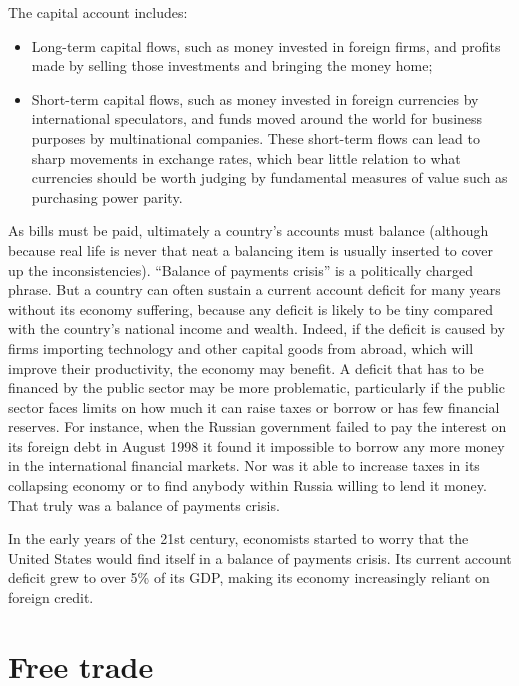 \documentclass[11pt,]{book}
\providecommand{\tightlist}{%
  \setlength{\itemsep}{0pt}\setlength{\parskip}{0pt}}
\theoremstyle{definition}
\theoremstyle{definition}
\theoremstyle{definition}
\theoremstyle{remark}
\begin{document}
The capital account includes:

\begin{itemize}
\tightlist
\item
  Long-term capital flows, such as money invested in foreign firms, and
  profits made by selling those investments and bringing the money home;
\item
  Short-term capital flows, such as money invested in foreign currencies
  by international speculators, and funds moved around the world for
  business purposes by multinational companies. These short-term flows
  can lead to sharp movements in exchange rates, which bear little
  relation to what currencies should be worth judging by fundamental
  measures of value such as purchasing power parity.
\end{itemize}

As bills must be paid, ultimately a country's accounts must balance
(although because real life is never that neat a balancing item is
usually inserted to cover up the inconsistencies). ``Balance of payments
crisis'' is a politically charged phrase. But a country can often
sustain a current account deficit for many years without its economy
suffering, because any deficit is likely to be tiny compared with the
country's national income and wealth. Indeed, if the deficit is caused
by firms importing technology and other capital goods from abroad, which
will improve their productivity, the economy may benefit. A deficit that
has to be financed by the public sector may be more problematic,
particularly if the public sector faces limits on how much it can raise
taxes or borrow or has few financial reserves. For instance, when the
Russian government failed to pay the interest on its foreign debt in
August 1998 it found it impossible to borrow any more money in the
international financial markets. Nor was it able to increase taxes in
its collapsing economy or to find anybody within Russia willing to lend
it money. That truly was a balance of payments crisis.

In the early years of the 21st century, economists started to worry that
the United States would find itself in a balance of payments crisis. Its
current account deficit grew to over 5\% of its GDP, making its economy
increasingly reliant on foreign credit.

\section{Free trade}\label{free-trade}
\end{document}
